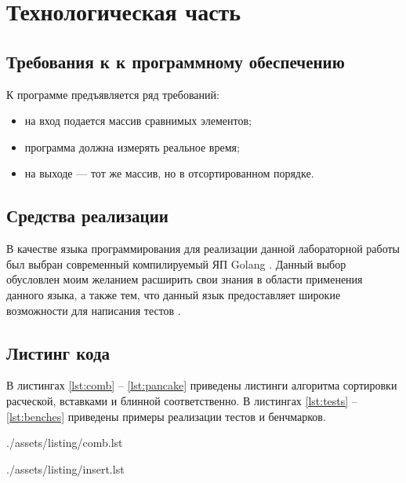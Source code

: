 \chapter{Технологическая часть}

\section{Требования к к программному обеспечению}

К программе предъявляется ряд требований:
\begin{itemize}[label=---]
	\item на вход подается массив сравнимых элементов;
	\item программа должна измерять реальное время;
	\item на выходе --- тот же массив, но в отсортированном порядке.
\end{itemize}

\section{Средства реализации}

В качестве языка программирования для реализации данной лабораторной работы был выбран современный компилируемый ЯП Golang \cite{golang}.
Данный выбор обусловлен моим желанием расширить свои знания в области применения данного языка, а также тем, что данный язык предоставляет широкие возможности для написания тестов \cite{gotest}.

\section{Листинг кода}

В листингах \ref{lst:comb} -- \ref{lst:pancake} приведены листинги алгоритма сортировки расческой, вставками и блинной соответственно.
В листингах \ref{lst:tests} -- \ref{lst:benches} приведены примеры реализации тестов и бенчмарков.

\clearpage
\begin{lstinputlisting}[
	caption={Алгоритм сортировки расческой},
	label={lst:comb},
	style={golang}
]{./assets/listing/comb.lst}
\end{lstinputlisting}

\begin{lstinputlisting}[
	caption={Алгоритм сортировки вставками},
	label={lst:insert},
	style={golang}
]{./assets/listing/insert.lst}
\end{lstinputlisting}

